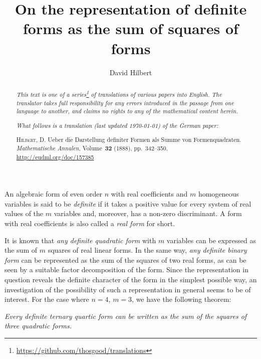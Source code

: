 \documentclass{article}
\theoremstyle{plain}
\theoremstyle{definition}
\begin{document}
\renewcommand{\abstractname}{Translator's note.}

\title{On the representation of definite forms as the sum of squares of forms}
\author{David Hilbert}
\date{}
\maketitle

\begin{abstract}
  \renewcommand*{\thefootnote}{\fnsymbol{footnote}}
  \emph{This text is one of a series\footnote{\url{https://github.com/thosgood/translations}} of translations of various papers into English.}
  \emph{The translator takes full responsibility for any errors introduced in the passage from one language to another, and claims no rights to any of the mathematical content herein.}
  
  \emph{What follows is a translation (last updated \today) of the German paper:}

  \medskip\noindent
  \textsc{Hilbert, D}. Ueber die Darstellung definiter Formen als Summe von Formenquadraten. \emph{Mathematische Annalen}, Volume~\textbf{32} (1888), pp.~342--350. {\footnotesize\url{http://eudml.org/doc/157385}}
\end{abstract}

\setcounter{footnote}{0}



\bigskip\bigskip

An algebraic form of even order $n$ with real coefficients and $m$ homogeneous variables is said to be \emph{definite} if it takes a positive value for every system of real values of the $m$ variables and, moreover, has a non-zero discriminant.
A form with real coefficients is also called a \emph{real form} for short.

It is known that \emph{any definite quadratic form} with $m$ variables can be expressed as the sum of $m$ squares of real linear forms.
In the same way, \emph{any definite binary form} can be represented as the sum of the squares of two real forms, as can be seen by a suitable factor decomposition of the form.
Since the representation in question reveals the definite character of the form in the simplest possible way, an investigation of the possibility of such a representation in general seems to be of interest.
For the case where $n=4$, $m=3$, we have the following theorem:

\emph{Every definite ternary quartic form can be written as the sum of the squares of three quadratic forms.}




\nocite{*}

\end{document}
